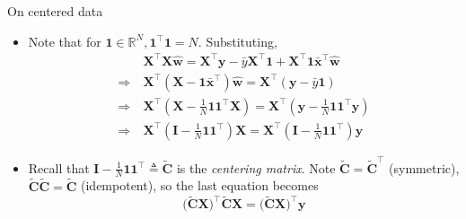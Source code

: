 \documentclass{beamer}
\numberwithin{equation}{section}
\begin{document}
\begin{frame}{On centered data}
    \begin{itemize}
        \item
        Note that for $ \mathbf{1} \in \mathbb{R}^N,
        \mathbf{1}^\top\mathbf{1} = N $. Substituting,
        \begin{equation*}
            \begin{split}
	            & \mathbf{X}^\top\mathbf{X}\hat{\mathbf{w}} =
	            \mathbf{X}^\top\mathbf{y} - \bar{y}\mathbf{X}^\top\mathbf{1} +
	            \mathbf{X}^\top\mathbf{1}\bar{\mathbf{x}}^\top\hat{\mathbf{w}} \\
	            \Rightarrow \ & \mathbf{X}^\top
	            (\mathbf{X} - \mathbf{1}\bar{\mathbf{x}}^\top)\hat{\mathbf{w}} =
	            \mathbf{X}^\top(\mathbf{y} - \bar{y}\mathbf{1}) \\
	            \Rightarrow \ & \mathbf{X}^\top\left(
	                \mathbf{X} - \frac{1}{N}\mathbf{11}^\top\mathbf{X}
	            \right) = \mathbf{X}^\top\left(
	                \mathbf{y} - \frac{1}{N}\mathbf{11}^\top\mathbf{y}
	            \right) \\
	            \Rightarrow \ & \mathbf{X}^\top\left(
	                \mathbf{I} - \frac{1}{N}\mathbf{11}^\top
	            \right)\mathbf{X} = \mathbf{X}^\top\left(
	                \mathbf{I} - \frac{1}{N}\mathbf{11}^\top
	            \right)\mathbf{y}
            \end{split}
        \end{equation*}

        \item
        Recall that $ \mathbf{I} - \frac{1}{N}\mathbf{11}^\top \triangleq
        \tilde{\mathbf{C}} $ is the \textit{centering matrix}. Note
        $ \tilde{\mathbf{C}} = \tilde{\mathbf{C}}^\top $ (symmetric),
        $ \tilde{\mathbf{C}}\tilde{\mathbf{C}} = \tilde{\mathbf{C}} $
        (idempotent), so the last equation becomes
        \begin{equation*}
            \big(\tilde{\mathbf{C}}\mathbf{X}\big)^\top\tilde{\mathbf{C}}
            \mathbf{X} = \big(\tilde{\mathbf{C}}\mathbf{X}\big)^\top\mathbf{y}
        \end{equation*}
    \end{itemize}
\end{frame}
\end{document}
